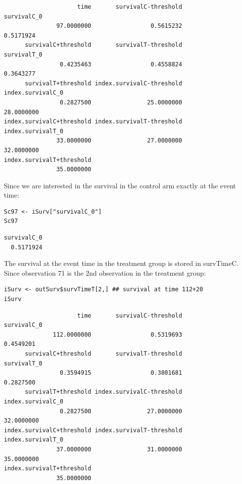 \documentclass[12pt]{article}
\begin{document}
\begin{verbatim}
                     time       survivalC-threshold               survivalC_0 
               97.0000000                 0.5615232                 0.5171924 
      survivalC+threshold       survivalT-threshold               survivalT_0 
                0.4235463                 0.4558824                 0.3643277 
      survivalT+threshold index.survivalC-threshold         index.survivalC_0 
                0.2827500                25.0000000                28.0000000 
index.survivalC+threshold index.survivalT-threshold         index.survivalT_0 
               33.0000000                27.0000000                32.0000000 
index.survivalT+threshold 
               35.0000000
\end{verbatim}

Since we are interested in the survival in the control arm exactly at the event time:
\lstset{language=r,label= ,caption= ,captionpos=b,numbers=none}
\begin{lstlisting}
Sc97 <- iSurv["survivalC_0"] 
Sc97
\end{lstlisting}

\begin{verbatim}
survivalC_0 
  0.5171924
\end{verbatim}


The survival at the event time in the treatment group is stored in
survTimeC. Since observation 71 is the 2nd observation in the treatment
group:
\lstset{language=r,label= ,caption= ,captionpos=b,numbers=none}
\begin{lstlisting}
iSurv <- outSurv$survTimeT[2,] ## survival at time 112+20
iSurv
\end{lstlisting}

\begin{verbatim}
                     time       survivalC-threshold               survivalC_0 
              112.0000000                 0.5319693                 0.4549201 
      survivalC+threshold       survivalT-threshold               survivalT_0 
                0.3594915                 0.3801681                 0.2827500 
      survivalT+threshold index.survivalC-threshold         index.survivalC_0 
                0.2827500                27.0000000                32.0000000 
index.survivalC+threshold index.survivalT-threshold         index.survivalT_0 
               37.0000000                31.0000000                35.0000000 
index.survivalT+threshold 
               35.0000000
\end{verbatim}
\end{document}
